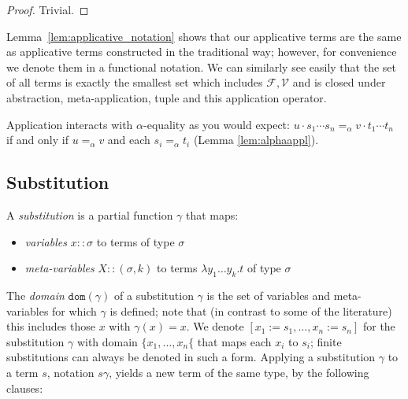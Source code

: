 \documentclass{lmcs}
\theoremstyle{theorem}\newtheorem{theorem}{Theorem}
\theoremstyle{theorem}\newtheorem{lemma}[theorem]{Lemma}
\theoremstyle{theorem}\newtheorem{corollary}[theorem]{Corollary}
\theoremstyle{definition}\newtheorem{definition}[theorem]{Definition}
\theoremstyle{definition}\newtheorem{example}[theorem]{Example}
\newcommand{\F}{\mathcal{F}}
\newcommand{\V}{\mathcal{V}}
\newcommand{\domain}{\mathtt{dom}}
\newcommand{\atype}{\sigma}
\newcommand{\avar}{x}
\newcommand{\bvar}{y}
\newcommand{\Avar}{X}
\newcommand{\abs}[2]{\lambda #1.#2}
\begin{document}
\begin{proof}
Trivial.
\end{proof}

Lemma~\ref{lem:applicative_notation} shows that our applicative terms are the
same as applicative terms constructed in the traditional way; however, for
convenience we denote them in a functional notation.
We can similarly see easily that the set of all terms is exactly the smallest
set which includes $\F,\V$ and is closed under abstraction, meta-application,
tuple and this application operator.

Application interacts with $\alpha$-equality as you would expect: $u \cdot s_1
\cdots s_n =_\alpha v \cdot t_1 \cdots t_n$ if and only if $u =_\alpha v$ and
each $s_i =_\alpha t_i$ (Lemma \ref{lem:alphaappl}).

\subsection{Substitution}

A \emph{substitution} is a partial function $\gamma$ that maps:
\begin{itemize}
\item \emph{variables} $\avar :: \atype$ to terms of type $\atype$
\item \emph{meta-variables} $\Avar :: (\atype,k)$ to terms $\abs{\bvar_1 \dots
  \bvar_k}{t}$ of type $\atype$
\end{itemize}
The \emph{domain} $\domain(\gamma)$ of a substitution $\gamma$ is the set of
variables and meta-variables for which $\gamma$ is defined; note that (in
contrast to some of the literature) this includes those $\avar$ with
$\gamma(\avar) = \avar$.
We denote $[x_1:=s_1,\dots,x_n:=s_n]$ for the substitution $\gamma$ with
domain $\{x_1,\dots,x_n\{$ that maps each $x_i$ to $s_i$; finite substitutions
can always be denoted in such a form.
Applying a substitution $\gamma$ to a term $s$, notation $s\gamma$, yields a
new term of the same type, by the following clauses:
\end{document}
